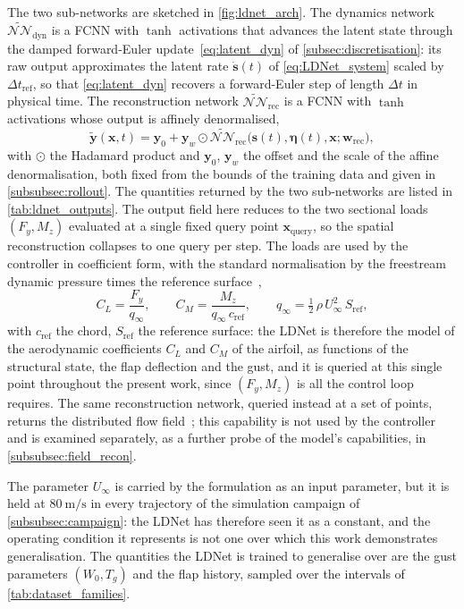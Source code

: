 The two sub-networks are sketched in \cref{fig:ldnet_arch}. The dynamics network $\widetilde{\mathcal{NN}}_{\mathrm{dyn}}$ is a FCNN with $\tanh$ activations that advances the latent state through the damped forward-Euler update~\eqref{eq:latent_dyn} of \cref{subsec:discretisation}: its raw output approximates the latent rate $\dot{\mathbf{s}}(t)$ of \eqref{eq:LDNet_system} scaled by $\Delta t_{\mathrm{ref}}$, so that \eqref{eq:latent_dyn} recovers a forward-Euler step of length $\Delta t$ in physical time. The reconstruction network $\widetilde{\mathcal{NN}}_{\mathrm{rec}}$ is a FCNN with $\tanh$ activations whose output is affinely denormalised,
\[
\widetilde{\mathbf{y}}(\mathbf{x},t) = \mathbf{y}_0 + \mathbf{y}_w \odot
    \widetilde{\mathcal{NN}}_{\mathrm{rec}}\big(\mathbf{s}(t), \boldsymbol{\eta}(t), \mathbf{x};
    \mathbf{w}_{\mathrm{rec}}\big),
\]
with $\odot$ the Hadamard product and $\mathbf{y}_0$, $\mathbf{y}_w$ the offset and the scale of the affine denormalisation, both fixed from the bounds of the training data and given in \cref{subsubsec:rollout}. The quantities returned by the two sub-networks are listed in \cref{tab:ldnet_outputs}. The output field here reduces to the two sectional loads $(F_y,M_z)$ evaluated at a single fixed query point $\mathbf{x}_\mathrm{query}$, so the spatial reconstruction collapses to one query per step. The loads are used by the controller in coefficient form, with the standard normalisation by the freestream dynamic pressure times the reference surface~\cite{anderson2017fundamentals},
\begin{equation}
C_L = \frac{F_y}{q_\infty}, \qquad
C_M = \frac{M_z}{q_\infty\,c_{\mathrm{ref}}}, \qquad
q_\infty = \tfrac{1}{2}\,\rho\,U_\infty^2\,S_{\mathrm{ref}},
\label{eq:coefficients}
\end{equation}
with $c_{\mathrm{ref}}$ the chord, $S_{\mathrm{ref}}$ the reference surface: the LDNet is therefore the model of the aerodynamic coefficients $C_L$ and $C_M$ of the airfoil, as functions of the structural state, the flap deflection and the gust, and it is queried at this single point throughout the present work, since $(F_y,M_z)$ is all the control loop requires. The same reconstruction network, queried instead at a set of points, returns the distributed flow field~\cite{Regazzoni}; this capability is not used by the controller and is examined separately, as a further probe of the model's capabilities, in \cref{subsubsec:field_recon}.

The parameter $U_\infty$ is carried by the formulation as an input parameter, but it is held
at $\SI{80}{\meter\per\second}$ in every trajectory of the simulation campaign of
\cref{subsubsec:campaign}: the LDNet has therefore seen it as a constant, and the operating
condition it represents is not one over which this work demonstrates generalisation. The
quantities the LDNet is trained to generalise over are the gust parameters $(W_0, T_g)$ and
the flap history, sampled over the intervals of \cref{tab:dataset_families}.

